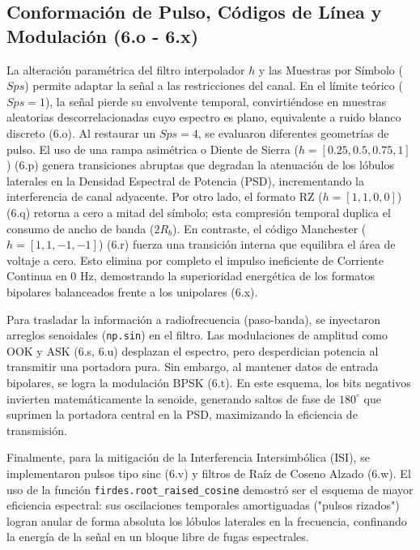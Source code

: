 
\subsection{Conformación de Pulso, Códigos de Línea y Modulación (6.o - 6.x)}

La alteración paramétrica del filtro interpolador $h$ y las Muestras por Símbolo ($Sps$) permite adaptar la señal a las restricciones del canal. En el límite teórico ($Sps=1$), la señal pierde su envolvente temporal, convirtiéndose en muestras aleatorias descorrelacionadas cuyo espectro es plano, equivalente a ruido blanco discreto (6.o). Al restaurar un $Sps=4$, se evaluaron diferentes geometrías de pulso. El uso de una rampa asimétrica o Diente de Sierra ($h=[0.25, 0.5, 0.75, 1]$) (6.p) genera transiciones abruptas que degradan la atenuación de los lóbulos laterales en la Densidad Espectral de Potencia (PSD), incrementando la interferencia de canal adyacente. Por otro lado, el formato RZ ($h=[1, 1, 0, 0]$) (6.q) retorna a cero a mitad del símbolo; esta compresión temporal duplica el consumo de ancho de banda ($2R_b$). En contraste, el código Manchester ($h=[1, 1, -1, -1]$) (6.r) fuerza una transición interna que equilibra el área de voltaje a cero. Esto elimina por completo el impulso ineficiente de Corriente Continua en $0\text{ Hz}$, demostrando la superioridad energética de los formatos bipolares balanceados frente a los unipolares (6.x).

Para trasladar la información a radiofrecuencia (paso-banda), se inyectaron arreglos senoidales (\texttt{np.sin}) en el filtro. Las modulaciones de amplitud como OOK y ASK (6.s, 6.u) desplazan el espectro, pero desperdician potencia al transmitir una portadora pura. Sin embargo, al mantener datos de entrada bipolares, se logra la modulación BPSK (6.t). En este esquema, los bits negativos invierten matemáticamente la senoide, generando saltos de fase de $180^\circ$ que suprimen la portadora central en la PSD, maximizando la eficiencia de transmisión.

Finalmente, para la mitigación de la Interferencia Intersimbólica (ISI), se implementaron pulsos tipo sinc (6.v) y filtros de Raíz de Coseno Alzado (6.w). El uso de la función \texttt{firdes.root\_raised\_cosine} demostró ser el esquema de mayor eficiencia espectral: sus oscilaciones temporales amortiguadas ("pulsos rizados") logran anular de forma absoluta los lóbulos laterales en la frecuencia, confinando la energía de la señal en un bloque libre de fugas espectrales.

